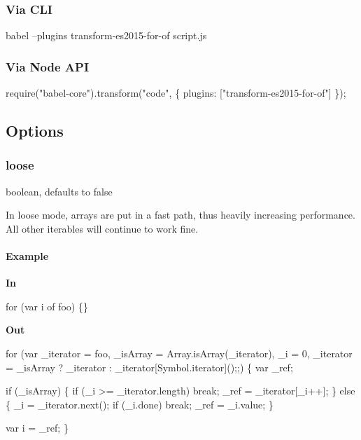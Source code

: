 \subsubsection*{Via C\+LI}


\begin{DoxyCode}
babel --plugins transform-es2015-for-of script.js
\end{DoxyCode}


\subsubsection*{Via Node A\+PI}


\begin{DoxyCode}
require("babel-core").transform("code", \{
  plugins: ["transform-es2015-for-of"]
\});
\end{DoxyCode}


\subsection*{Options}

\subsubsection*{{\ttfamily loose}}

{\ttfamily boolean}, defaults to {\ttfamily false}

In loose mode, arrays are put in a fast path, thus heavily increasing performance. All other iterables will continue to work fine.

\paragraph*{Example}

{\bfseries In}


\begin{DoxyCode}
for (var i of foo) \{\}
\end{DoxyCode}


{\bfseries Out}


\begin{DoxyCode}
for (var \_iterator = foo, \_isArray = Array.isArray(\_iterator), \_i = 0, \_iterator = \_isArray ? \_iterator :
       \_iterator[Symbol.iterator]();;) \{
  var \_ref;

  if (\_isArray) \{
    if (\_i >= \_iterator.length) break;
    \_ref = \_iterator[\_i++];
  \} else \{
    \_i = \_iterator.next();
    if (\_i.done) break;
    \_ref = \_i.value;
  \}

  var i = \_ref;
\}
\end{DoxyCode}


